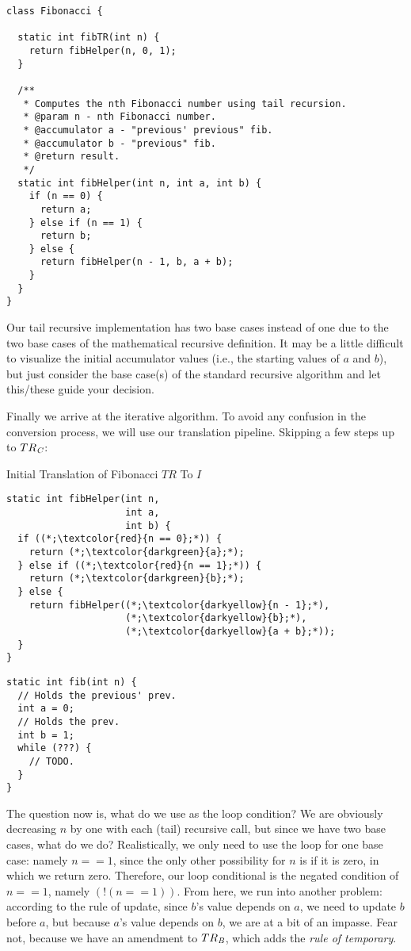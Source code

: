 \begin{lstlisting}[language=MyJava]
class Fibonacci {

  static int fibTR(int n) {
    return fibHelper(n, 0, 1);
  }

  /**
   * Computes the nth Fibonacci number using tail recursion.
   * @param n - nth Fibonacci number.
   * @accumulator a - "previous' previous" fib.
   * @accumulator b - "previous" fib.
   * @return result.
   */
  static int fibHelper(int n, int a, int b) {
    if (n == 0) {
      return a;
    } else if (n == 1) {
      return b;
    } else {
      return fibHelper(n - 1, b, a + b);
    }
  }
}
\end{lstlisting}

Our tail recursive implementation has two base cases instead of one due to the two base cases of the mathematical recursive definition. It may be a little difficult to visualize the initial accumulator values (i.e., the starting values of $a$ and $b$), but just consider the base case(s) of the standard recursive algorithm and let this/these guide your decision.

Finally we arrive at the iterative algorithm. To avoid any confusion in the conversion process, we will use our translation pipeline. Skipping a few steps up to $TR_\emph{C}$:

\begin{clrr}[]{Initial Translation of Fibonacci \emph{$TR$} To $I$}
\begin{lstlisting}[language=MyJavaNF]
static int fibHelper(int n, 
                     int a, 
                     int b) {
  if ((*;\textcolor{red}{n == 0};*)) {
    return (*;\textcolor{darkgreen}{a};*);
  } else if ((*;\textcolor{red}{n == 1};*)) {
    return (*;\textcolor{darkgreen}{b};*);
  } else {
    return fibHelper((*;\textcolor{darkyellow}{n - 1};*), 
                     (*;\textcolor{darkyellow}{b};*), 
                     (*;\textcolor{darkyellow}{a + b};*));
  }
}
\end{lstlisting}
\tcblower
\begin{lstlisting}[language=MyJavaNF]
static int fib(int n) {
  // Holds the previous' prev.
  int a = 0;
  // Holds the prev.
  int b = 1;
  while (???) {
    // TODO.
  }
}
\end{lstlisting}
\end{clrr}

The question now is, what do we use as the  loop condition? We are obviously decreasing $n$ by one with each (tail) recursive call, but since we have two base cases, what do we do? Realistically, we only need to use the loop for one base case: namely $n == 1$, since the only other possibility for $n$ is if it is zero, in which we return zero. Therefore, our loop conditional is the negated condition of $n == 1$, namely $(!(n == 1))$. From here, we run into another problem: according to the rule of update, since $b$'s value depends on $a$, we need to update $b$ before $a$, but because $a$'s value depends on $b$, we are at a bit of an impasse. Fear not, because we have an amendment to $TR_\emph{B}$, which adds the \emph{rule of temporary}.

